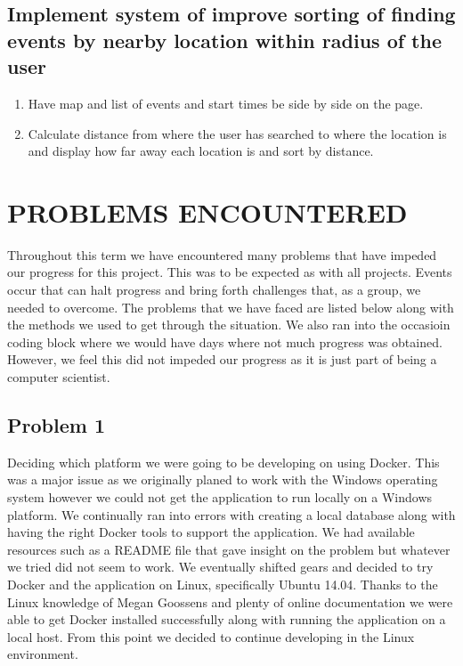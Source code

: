 \documentclass[draftclsnofoot,10pt,onecolumn]{IEEEtran} %
\begin{document}
\subsection{Implement system of improve sorting of finding events by nearby location within radius of the user}
\begin{enumerate}
  \item Have map and list of events and start times be side by side on the page.
  \item Calculate distance from where the user has searched to where the location is and display how far away each location is and sort by distance.
\end{enumerate}

\section{PROBLEMS ENCOUNTERED}

Throughout this term we have encountered many problems that have impeded our
progress for this project. This was to be expected as with all projects. 
Events
occur that can halt progress and bring forth challenges that, as a group, we
needed to overcome. The problems that we have faced are listed below along with
the methods we used to get through the situation. We also ran into the occasioin coding block where we would have days where not much progress was obtained. However, we feel this did not impeded our progress as
it is just part of being a computer scientist.

\subsection{Problem 1}
Deciding which platform we were going to be developing on using Docker. This was
a major issue as we originally planed to work with the Windows operating system
however we could not get the application to run locally on a Windows platform.
We continually ran into errors with creating a local database along with having
the right Docker tools to support the application. We had available resources
such as a README file that gave insight on the problem but whatever we tried did
not seem to work. We eventually shifted gears and decided to try Docker and the
application on Linux, specifically Ubuntu 14.04. Thanks to the Linux knowledge
of Megan Goossens and plenty of online documentation we were able to get Docker
installed successfully along with running the application on a local host. From
this point we decided to continue developing in the Linux environment.
\end{document}
